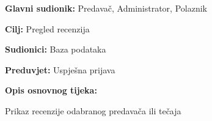 			\noindent {}
			\begin{packed_item}
				
				\item \textbf{Glavni sudionik:} Predavač, Administrator, Polaznik
				\item  \textbf{Cilj:} Pregled recenzija
				\item  \textbf{Sudionici:} Baza podataka
				\item  \textbf{Preduvjet:} Uspješna prijava
				\item  \textbf{Opis osnovnog tijeka:}
				
				\item[] \begin{packed_enum}
					
					\item Prikaz recenzije odabranog predavača ili tečaja
					
				\end{packed_enum}
				
			\end{packed_item}
		
